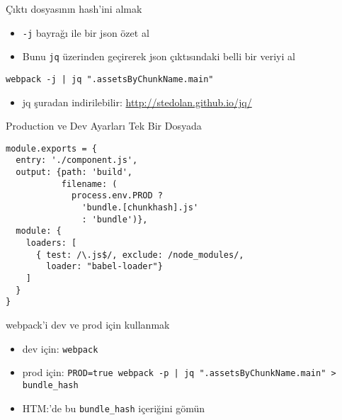 \documentclass[presentation]{beamer}
\begin{document}
\begin{frame}[fragile,label=sec-9]{Çıktı dosyasının hash'ini almak}
 \begin{itemize}
\item \texttt{-j} bayrağı ile bir json özet al
\item Bunu \texttt{jq} üzerinden geçirerek json çıktısındaki belli bir veriyi al
\end{itemize}

\begin{verbatim}
webpack -j | jq ".assetsByChunkName.main"
\end{verbatim}
\begin{itemize}
\item jq şuradan indirilebilir: \url{http://stedolan.github.io/jq/}
\end{itemize}
\end{frame}

\begin{frame}[fragile,label=sec-10]{Production ve Dev Ayarları Tek Bir Dosyada}
 \begin{verbatim}
module.exports = {
  entry: './component.js',
  output: {path: 'build',
           filename: (
             process.env.PROD ?
               'bundle.[chunkhash].js'
               : 'bundle')},
  module: {
    loaders: [
      { test: /\.js$/, exclude: /node_modules/,
        loader: "babel-loader"}
    ]
  }
}
\end{verbatim}
\end{frame}

\begin{frame}[fragile,label=sec-11]{webpack'i dev ve prod için kullanmak}
 \begin{itemize}
\item dev için: \texttt{webpack}
\item prod için: \verb~PROD=true webpack -p | jq ".assetsByChunkName.main" >   bundle_hash~
\item HTM:'de bu \texttt{bundle\_hash} içeriğini gömün
\end{itemize}
\end{frame}
\end{document}
